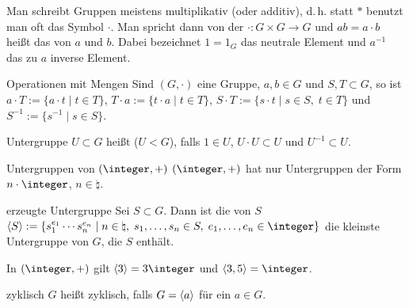\begin{Bem}
    Man schreibt Gruppen meistens multiplikativ (oder additiv), d.\,h. statt
    $\ast$ benutzt man oft das Symbol $\cdot$.
    Man spricht dann von der 
    $\cdot\colon G \times G \rightarrow G$ und $ab = a \cdot b$ heißt das
     von $a$ und $b$.
    Dabei bezeichnet $1 = 1_G$ das neutrale Element und $a^{-1}$ das zu
    $a$ inverse Element.
\end{Bem}

\linie

\begin{Def}{Operationen mit Mengen}
    Sind $(G, \cdot)$ eine Gruppe, $a, b \in G$ und $S, T \subset G$, so ist \\
    $a \cdot T := \{a \cdot t \;|\; t \in T\}$, \qquad
    $T \cdot a := \{t \cdot a \;|\; t \in T\}$, \qquad
    $S \cdot T := \{s \cdot t \;|\; s \in S,\; t \in T\}$ und \\
    $S^{-1} := \{s^{-1} \;|\; s \in S\}$.
\end{Def}

\begin{Def}{Untergruppe}
    $U \subset G$ heißt  ($U < G$), falls
    $1 \in U$, $U \cdot U \subset U$ und $U^{-1} \subset U$.
\end{Def}

\begin{Satz}{Untergruppen von $(\integer, +)$}
    $(\integer, +)$ hat nur Untergruppen der Form $n \cdot \integer$,
    $n \in \natural$.
\end{Satz}

\linie

\begin{Def}{erzeugte Untergruppe}
    Sei $S \subset G$.
    Dann ist die von $S$  \\
    $\aufspann{S} := \{s_1^{e_1} \dotsm s_n^{e_n} \;|\; n \in \natural,\;
    s_1, \dotsc, s_n \in S,\; e_1, \dotsc, e_n \in \integer\}$
    die kleinste Untergruppe von $G$, die $S$ enthält.
\end{Def}

\begin{Bsp}
    In $(\integer, +)$ gilt $\aufspann{3} = 3\integer$ und
    $\aufspann{3, 5} = \integer$.
\end{Bsp}

\begin{Def}{zyklisch}
    $G$ heißt zyklisch, falls $G = \left\langle{a}\right\rangle$ für ein $a \in G$.
\end{Def}

